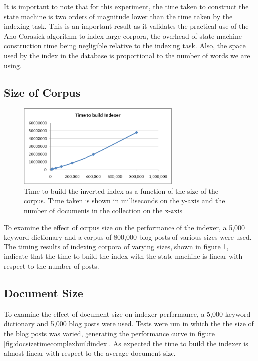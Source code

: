 \documentclass[10pt]{article}
\begin{document}
It is important to note that for this experiment, the time taken to
construct the state machine is two orders of magnitude lower than the
time taken by the indexing task. This is an important result as it
validates the practical use of the Aho-Corasick algorithm to index
large corpora, the overhead of state machine construction time being
negligible relative to the indexing task. Also, the space used by the
index in the database is proportional to the number of words we are
using. 


\subsection{Size of Corpus}

\begin{figure}
  \begin{center}
        \includegraphics[width=0.70\textwidth,height=!]{corpsizetimecomplexbuildindex}
  \end{center}
    \caption{Time to build the inverted index as a function of the
      size of the corpus. Time taken is shown in milliseconds on the
      y-axis and the number of documents in the collection on the
      x-axis} 
    \label{fig:corpsizetimecomplexbuildindex}
\end{figure} 


To examine the effect of corpus size on the performance of the
indexer, a 5,000 keyword dictionary and a corpus of 800,000 blog posts
of various sizes were used. The timing results of indexing corpora of
varying sizes, shown in figure
\ref{fig:corpsizetimecomplexbuildindex}, indicate that the time to
build the index with the state machine is linear with respect to the
number of posts. 


\subsection{Document Size} 
To examine the effect of document size on indexer performance, 
a 5,000 keyword dictionary and 5,000 blog posts were used. Tests were
run in which the the size of the blog posts was varied, generating the
performance curve in figure \ref{fig:docsizetimecomplexbuildindex}.  
As expected the time to build the indexer is almost linear with
respect to the average document size.
\end{document}
